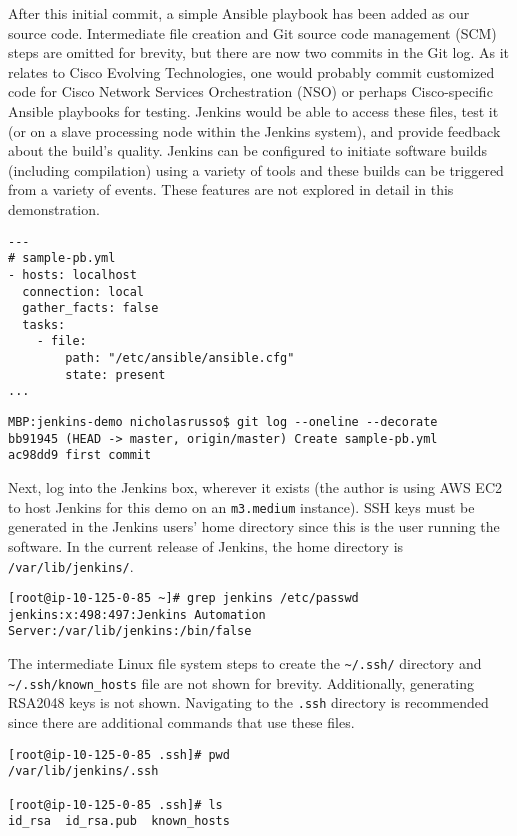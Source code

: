 After this initial commit, a simple Ansible playbook has been added as our
source code. Intermediate file creation and Git source code management (SCM)
steps are omitted for brevity, but there are now two commits in the Git log.
As it relates to Cisco Evolving Technologies, one would probably commit
customized code for Cisco Network Services Orchestration (NSO) or perhaps
Cisco-specific Ansible playbooks for testing. Jenkins would be able to access
these files, test it (or on a slave processing node within the Jenkins
system), and provide feedback about the build's quality. Jenkins can be
configured to initiate software builds (including compilation) using a variety
of tools and these builds can be triggered from a variety of events. These
features are not explored in detail in this demonstration.

\begin{verbatim}
---
# sample-pb.yml
- hosts: localhost
  connection: local
  gather_facts: false
  tasks:
    - file:
        path: "/etc/ansible/ansible.cfg"
        state: present
...
\end{verbatim}

\begin{verbatim}
MBP:jenkins-demo nicholasrusso$ git log --oneline --decorate
bb91945 (HEAD -> master, origin/master) Create sample-pb.yml
ac98dd9 first commit
\end{verbatim}

Next, log into the Jenkins box, wherever it exists (the author is using AWS
EC2 to host Jenkins for this demo on an \verb|m3.medium| instance). SSH keys
must be generated in the Jenkins users' home directory since this is the user
running the software. In the current release of Jenkins, the home directory is
\verb|/var/lib/jenkins/|.

\begin{verbatim}
[root@ip-10-125-0-85 ~]# grep jenkins /etc/passwd
jenkins:x:498:497:Jenkins Automation Server:/var/lib/jenkins:/bin/false
\end{verbatim}

The intermediate Linux file system steps to create the \verb|~/.ssh/|
directory and \verb|~/.ssh/known_hosts| file are not shown for brevity.
Additionally, generating RSA2048 keys is not shown.  Navigating to the
\verb|.ssh| directory is recommended since there are additional commands that
use these files.

\begin{verbatim}
[root@ip-10-125-0-85 .ssh]# pwd
/var/lib/jenkins/.ssh

[root@ip-10-125-0-85 .ssh]# ls
id_rsa  id_rsa.pub  known_hosts
\end{verbatim}

